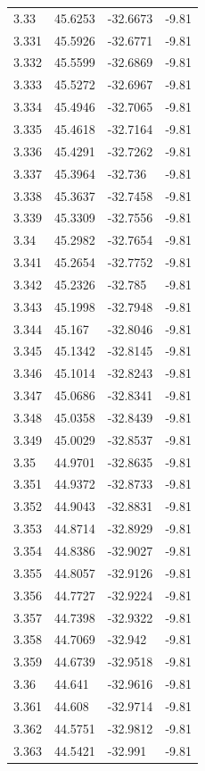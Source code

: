 \begin{tabular}{llll}
3.33 & 45.6253 & -32.6673 & -9.81 \\
3.331 & 45.5926 & -32.6771 & -9.81 \\
3.332 & 45.5599 & -32.6869 & -9.81 \\
3.333 & 45.5272 & -32.6967 & -9.81 \\
3.334 & 45.4946 & -32.7065 & -9.81 \\
3.335 & 45.4618 & -32.7164 & -9.81 \\
3.336 & 45.4291 & -32.7262 & -9.81 \\
3.337 & 45.3964 & -32.736 & -9.81 \\
3.338 & 45.3637 & -32.7458 & -9.81 \\
3.339 & 45.3309 & -32.7556 & -9.81 \\
3.34 & 45.2982 & -32.7654 & -9.81 \\
3.341 & 45.2654 & -32.7752 & -9.81 \\
3.342 & 45.2326 & -32.785 & -9.81 \\
3.343 & 45.1998 & -32.7948 & -9.81 \\
3.344 & 45.167 & -32.8046 & -9.81 \\
3.345 & 45.1342 & -32.8145 & -9.81 \\
3.346 & 45.1014 & -32.8243 & -9.81 \\
3.347 & 45.0686 & -32.8341 & -9.81 \\
3.348 & 45.0358 & -32.8439 & -9.81 \\
3.349 & 45.0029 & -32.8537 & -9.81 \\
3.35 & 44.9701 & -32.8635 & -9.81 \\
3.351 & 44.9372 & -32.8733 & -9.81 \\
3.352 & 44.9043 & -32.8831 & -9.81 \\
3.353 & 44.8714 & -32.8929 & -9.81 \\
3.354 & 44.8386 & -32.9027 & -9.81 \\
3.355 & 44.8057 & -32.9126 & -9.81 \\
3.356 & 44.7727 & -32.9224 & -9.81 \\
3.357 & 44.7398 & -32.9322 & -9.81 \\
3.358 & 44.7069 & -32.942 & -9.81 \\
3.359 & 44.6739 & -32.9518 & -9.81 \\
3.36 & 44.641 & -32.9616 & -9.81 \\
3.361 & 44.608 & -32.9714 & -9.81 \\
3.362 & 44.5751 & -32.9812 & -9.81 \\
3.363 & 44.5421 & -32.991 & -9.81 \\

\end{tabular}
